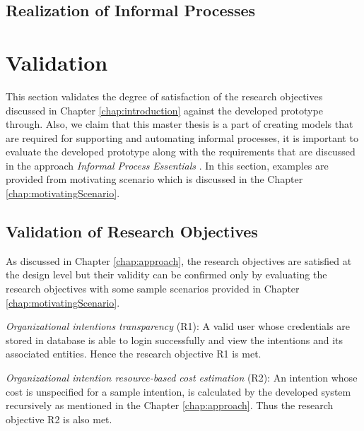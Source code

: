 	\subsection{Realization of Informal Processes}
	
	
	
\section{Validation}
\label{sec:validation}
This section validates the degree of satisfaction of the research objectives discussed in Chapter \ref{chap:introduction} against the developed prototype through. Also, we claim that this master thesis is a part of creating models that are required for supporting and automating informal processes, it is important to evaluate the developed prototype along with the requirements that are discussed in the approach \textit{Informal Process Essentials} \cite{Sungur2014a}. In this section, examples are provided from motivating scenario which is discussed in the Chapter \ref{chap:motivatingScenario}.
		
\subsection{Validation of Research Objectives}
\label{subsec:validationofrequirements}
As discussed in Chapter \ref{chap:approach}, the research objectives are satisfied at the design level but their validity can be confirmed only by evaluating the research objectives with some sample scenarios provided in Chapter \ref{chap:motivatingScenario}.   

\textit{Organizational intentions transparency} (R1): A valid user whose credentials are stored in database is able to login successfully and view the intentions and its associated entities. Hence the research objective R1 is met.

\textit{Organizational intention resource-based cost estimation} (R2): An intention whose cost is unspecified for a sample intention, is calculated by the developed system recursively as mentioned in the Chapter \ref{chap:approach}. Thus the research objective R2 is also met.

